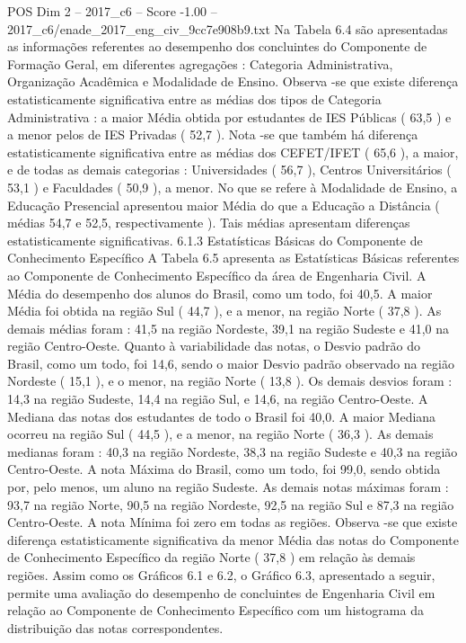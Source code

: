 \begin{textsample}{POS Dim 2 – 2017\_c6 – Score -1.00 – 2017\_c6/enade\_2017\_eng\_civ\_9cc7e908b9.txt}
Na Tabela 6.4 são apresentadas as informações referentes ao desempenho dos concluintes do Componente de Formação Geral, em diferentes agregações : Categoria Administrativa, Organização Acadêmica e Modalidade de Ensino.
Observa -se que existe diferença estatisticamente significativa entre as médias dos tipos de Categoria Administrativa : a maior Média obtida por estudantes de IES Públicas ( 63,5 ) e a menor pelos de IES Privadas ( 52,7 ).
Nota -se que também há diferença estatisticamente significativa entre as médias dos CEFET/IFET ( 65,6 ), a maior, e de todas as demais categorias : Universidades ( 56,7 ), Centros Universitários ( 53,1 ) e Faculdades ( 50,9 ), a menor.
No que se refere à Modalidade de Ensino, a Educação Presencial apresentou maior Média do que a Educação a Distância ( médias 54,7 e 52,5, respectivamente ).
Tais médias apresentam diferenças estatisticamente significativas. 6.1.3 Estatísticas Básicas do Componente de Conhecimento Específico A Tabela 6.5 apresenta as Estatísticas Básicas referentes ao Componente de Conhecimento Específico da área de Engenharia Civil.
A Média do desempenho dos alunos do Brasil, como um todo, foi 40,5.
A maior Média foi obtida na região Sul ( 44,7 ), e a menor, na região Norte ( 37,8 ).
As demais médias foram : 41,5 na região Nordeste, 39,1 na região Sudeste e 41,0 na região Centro-Oeste.
Quanto à variabilidade das notas, o Desvio padrão do Brasil, como um todo, foi 14,6, sendo o maior Desvio padrão observado na região Nordeste ( 15,1 ), e o menor, na região Norte ( 13,8 ).
Os demais desvios foram : 14,3 na região Sudeste, 14,4 na região Sul, e 14,6, na região Centro-Oeste.
A Mediana das notas dos estudantes de todo o Brasil foi 40,0.
A maior Mediana ocorreu na região Sul ( 44,5 ), e a menor, na região Norte ( 36,3 ).
As demais medianas foram : 40,3 na região Nordeste, 38,3 na região Sudeste e 40,3 na região Centro-Oeste.
A nota Máxima do Brasil, como um todo, foi 99,0, sendo obtida por, pelo menos, um aluno na região Sudeste.
As demais notas máximas foram : 93,7 na região Norte, 90,5 na região Nordeste, 92,5 na região Sul e 87,3 na região Centro-Oeste.
A nota Mínima foi zero em todas as regiões.
Observa -se que existe diferença estatisticamente significativa da menor Média das notas do Componente de Conhecimento Específico da região Norte ( 37,8 ) em relação às demais regiões.
Assim como os Gráficos 6.1 e 6.2, o Gráfico 6.3, apresentado a seguir, permite uma avaliação do desempenho de concluintes de Engenharia Civil em relação ao Componente de Conhecimento Específico com um histograma da distribuição das notas correspondentes.

\end{textsample}
